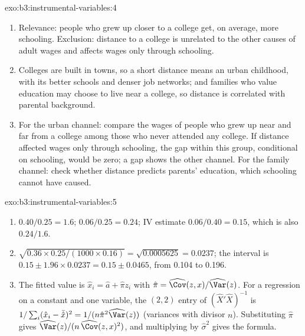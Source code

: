 \begin{solution}{exo:b3:instrumental-variables:4}
\begin{enumerate}
\item Relevance: people who grew up closer to a college get, on average, more
schooling. Exclusion: distance to a college is unrelated to the other causes
of adult wages and affects wages only through schooling.
\item Colleges are built in towns, so a short distance means an urban
childhood, with its better schools and denser job networks; and families who
value education may choose to live near a college, so distance is correlated
with parental background.
\item For the urban channel: compare the wages of people who grew up near and
far from a college among those who never attended any college. If distance
affected wages only through schooling, the gap within this group, conditional
on schooling, would be zero; a gap shows the other channel. For the family
channel: check whether distance predicts parents' education, which schooling
cannot have caused.
\end{enumerate}
\end{solution}

\begin{solution}{exo:b3:instrumental-variables:5}
\begin{enumerate}
\item {} $0.40/0.25 = 1.6$;  $0.06/0.25 = 0.24$; IV
estimate $0.06/0.40 = 0.15$, which is also $0.24/1.6$.
\item $\sqrt{0.36 \times 0.25/(1000 \times 0.16)} = \sqrt{0.0005625} = 0.0237$;
the interval is $0.15 \pm 1.96 \times 0.0237 = 0.15 \pm 0.0465$, from 0.104 to
0.196.
\item The fitted value is $\hat x_i = \hat a + \hat\pi z_i$ with $\hat\pi =
\widehat{\Cov}(z, x)/\widehat{\Var}(z)$. For a regression on a constant and one
variable, the $(2,2)$ entry of $(\hat X'\hat X)^{-1}$ is $1/\sum_i (\hat x_i -
\bar{\hat x})^2 = 1/(n \hat\pi^2 \widehat{\Var}(z))$ (variances with divisor
$n$). Substituting $\hat\pi$ gives $\widehat{\Var}(z)/(n\,\widehat{\Cov}(z,
x)^2)$, and multiplying by $\hat\sigma^2$ gives the formula.
\end{enumerate}
\end{solution}

